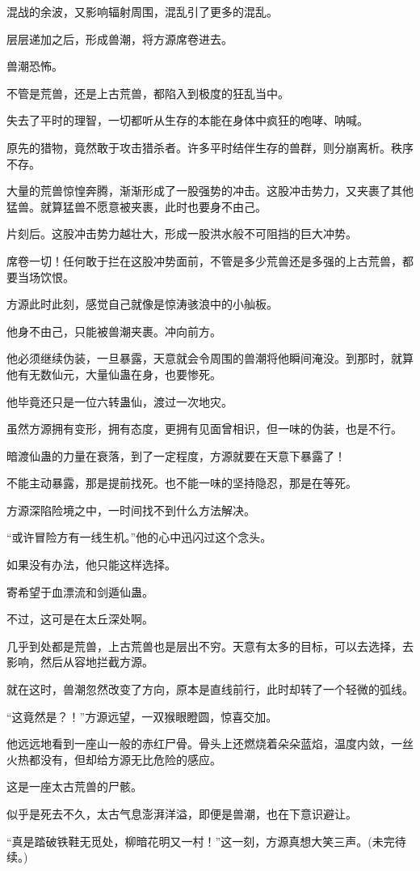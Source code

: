 \begin{this_body}
混战的余波，又影响辐射周围，混乱引了更多的混乱。

层层递加之后，形成兽潮，将方源席卷进去。

兽潮恐怖。

不管是荒兽，还是上古荒兽，都陷入到极度的狂乱当中。

失去了平时的理智，一切都听从生存的本能在身体中疯狂的咆哮、呐喊。

原先的猎物，竟然敢于攻击猎杀者。许多平时结伴生存的兽群，则分崩离析。秩序不存。

大量的荒兽惊惶奔腾，渐渐形成了一股强势的冲击。这股冲击势力，又夹裹了其他猛兽。就算猛兽不愿意被夹裹，此时也要身不由己。

片刻后。这股冲击势力越壮大，形成一股洪水般不可阻挡的巨大冲势。

席卷一切！任何敢于拦在这股冲势面前，不管是多少荒兽还是多强的上古荒兽，都要当场饮恨。

方源此时此刻，感觉自己就像是惊涛骇浪中的小舢板。

他身不由己，只能被兽潮夹裹。冲向前方。

他必须继续伪装，一旦暴露，天意就会令周围的兽潮将他瞬间淹没。到那时，就算他有无数仙元，大量仙蛊在身，也要惨死。

他毕竟还只是一位六转蛊仙，渡过一次地灾。

虽然方源拥有变形，拥有态度，更拥有见面曾相识，但一味的伪装，也是不行。

暗渡仙蛊的力量在衰落，到了一定程度，方源就要在天意下暴露了！

不能主动暴露，那是提前找死。也不能一味的坚持隐忍，那是在等死。

方源深陷险境之中，一时间找不到什么方法解决。

“或许冒险方有一线生机。”他的心中迅闪过这个念头。

如果没有办法，他只能这样选择。

寄希望于血漂流和剑遁仙蛊。

不过，这可是在太丘深处啊。

几乎到处都是荒兽，上古荒兽也是层出不穷。天意有太多的目标，可以去选择，去影响，然后从容地拦截方源。

就在这时，兽潮忽然改变了方向，原本是直线前行，此时却转了一个轻微的弧线。

“这竟然是？！”方源远望，一双猴眼瞪圆，惊喜交加。

他远远地看到一座山一般的赤红尸骨。骨头上还燃烧着朵朵蓝焰，温度内敛，一丝火热都没有，但却给方源无比危险的感应。

这是一座太古荒兽的尸骸。

似乎是死去不久，太古气息澎湃洋溢，即便是兽潮，也在下意识避让。

“真是踏破铁鞋无觅处，柳暗花明又一村！”这一刻，方源真想大笑三声。(未完待续。)

\end{this_body}


